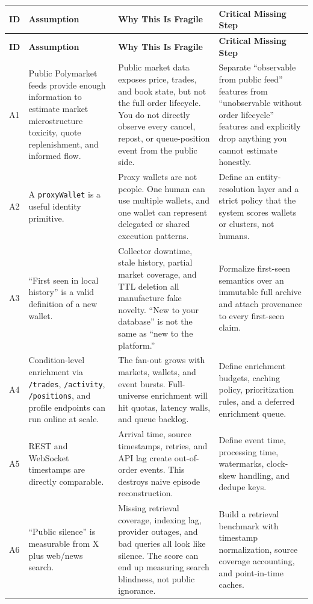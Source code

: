 \documentclass[11pt,letterpaper]{article}
\begin{document}
\begingroup
\footnotesize
\setlength{\tabcolsep}{4pt}
\begin{longtable}{p{0.7cm}p{3.7cm}p{5.0cm}p{5.0cm}}
\toprule
\textbf{ID} & \textbf{Assumption} & \textbf{Why This Is Fragile} & \textbf{Critical Missing Step} \\
\midrule
\endfirsthead
\toprule
\textbf{ID} & \textbf{Assumption} & \textbf{Why This Is Fragile} & \textbf{Critical Missing Step} \\
\midrule
\endhead
A1 & Public Polymarket feeds provide enough information to estimate market microstructure toxicity, quote replenishment, and informed flow. & Public market data exposes price, trades, and book state, but not the full order lifecycle. You do not directly observe every cancel, repost, or queue-position event from the public side. & Separate ``observable from public feed'' features from ``unobservable without order lifecycle'' features and explicitly drop anything you cannot estimate honestly. \\
\addlinespace
A2 & A \texttt{proxyWallet} is a useful identity primitive. & Proxy wallets are not people. One human can use multiple wallets, and one wallet can represent delegated or shared execution patterns. & Define an entity-resolution layer and a strict policy that the system scores wallets or clusters, not humans. \\
\addlinespace
A3 & ``First seen in local history'' is a valid definition of a new wallet. & Collector downtime, stale history, partial market coverage, and TTL deletion all manufacture fake novelty. ``New to your database'' is not the same as ``new to the platform.'' & Formalize first-seen semantics over an immutable full archive and attach provenance to every first-seen claim. \\
\addlinespace
A4 & Condition-level enrichment via \texttt{/trades}, \texttt{/activity}, \texttt{/positions}, and profile endpoints can run online at scale. & The fan-out grows with markets, wallets, and event bursts. Full-universe enrichment will hit quotas, latency walls, and queue backlog. & Define enrichment budgets, caching policy, prioritization rules, and a deferred enrichment queue. \\
\addlinespace
A5 & REST and WebSocket timestamps are directly comparable. & Arrival time, source timestamps, retries, and API lag create out-of-order events. This destroys naive episode reconstruction. & Define event time, processing time, watermarks, clock-skew handling, and dedupe keys. \\
\addlinespace
A6 & ``Public silence'' is measurable from X plus web/news search. & Missing retrieval coverage, indexing lag, provider outages, and bad queries all look like silence. The score can end up measuring search blindness, not public ignorance. & Build a retrieval benchmark with timestamp normalization, source coverage accounting, and point-in-time caches. \\

\end{longtable}
\end{document}
